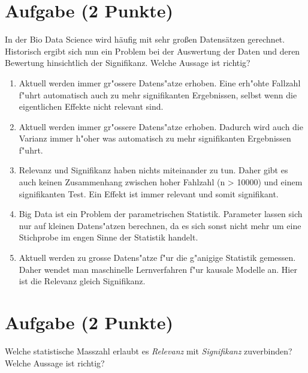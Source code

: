 \documentclass[a4paper, 10pt]{scrartcl}\usepackage[]{graphicx}\usepackage[]{xcolor}
\begin{document}
\section{Aufgabe \hfill (2 Punkte)}

In der Bio Data Science wird h{\"a}ufig mit sehr gro{\ss}en Datens{\"a}tzen
gerechnet. Historisch ergibt sich nun ein Problem bei der Auswertung der
Daten und deren Bewertung hinsichtlich der Signifikanz. Welche Aussage ist richtig?



\begin{enumerate}
\item [\textbf{A} \msquare] Aktuell werden immer gr{"o}ssere Datens{"a}tze erhoben. Eine erh{"o}hte Fallzahl f{"u}hrt automatisch auch zu mehr signifikanten Ergebnissen, selbst wenn die eigentlichen Effekte nicht relevant sind.
\item [\textbf{B} \msquare] Aktuell werden immer gr{"o}ssere Datens{"a}tze erhoben. Dadurch wird auch die Varianz immer h{"o}her was automatisch zu mehr signifikanten Ergebnissen f{"u}hrt.
\item [\textbf{C} \msquare] Relevanz und Signifikanz haben nichts miteinander zu tun. Daher gibt es auch keinen Zusammenhang zwischen hoher Fahlzahl (n > 10000) und einem signifikanten Test. Ein Effekt ist immer relevant und somit signifikant.
\item [\textbf{D} \msquare] Big Data ist ein Problem der parametrischen Statistik. Parameter lassen sich nur auf kleinen Datens{"a}tzen berechnen, da es sich sonst nicht mehr um eine Stichprobe im engen Sinne der Statistik handelt.
\item [\textbf{E} \msquare] Aktuell werden zu grosse Datens{"a}tze f{"u}r die g{"a}nigige Statistik gemessen. Daher wendet man maschinelle Lernverfahren f{"u}r kausale Modelle an. Hier ist die Relevanz gleich Signifikanz.
\end{enumerate}

\section{Aufgabe \hfill (2 Punkte)}

Welche statistische Masszahl erlaubt es \textit{Relevanz} mit
\textit{Signifikanz} zuverbinden? Welche Aussage ist richtig?
\end{document}
